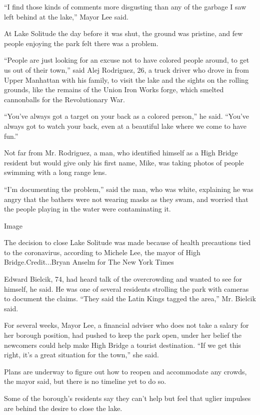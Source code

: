 ``I find those kinds of comments more disgusting than any of the garbage
I saw left behind at the lake,'' Mayor Lee said.

At Lake Solitude the day before it was shut, the ground was pristine,
and few people enjoying the park felt there was a problem.

``People are just looking for an excuse not to have colored people
around, to get us out of their town,'' said Alej Rodriguez, 26, a truck
driver who drove in from Upper Manhattan with his family, to visit the
lake and the sights on the rolling grounds, like the remains of the
Union Iron Works forge, which smelted cannonballs for the Revolutionary
War.

``You've always got a target on your back as a colored person,'' he
said. ``You've always got to watch your back, even at a beautiful lake
where we come to have fun.''

Not far from Mr. Rodriguez, a man, who identified himself as a High
Bridge resident but would give only his first name, Mike, was taking
photos of people swimming with a long range lens.

``I'm documenting the problem,'' said the man, who was white, explaining
he was angry that the bathers were not wearing masks as they swam, and
worried that the people playing in the water were contaminating it.

Image

The decision to close Lake Solitude was made because of health
precautions tied to the coronavirus, according to Michele Lee, the mayor
of High Bridge.Credit...Bryan Anselm for The New York Times

Edward Bielcik, 74, had heard talk of the overcrowding and wanted to see
for himself, he said. He was one of several residents strolling the park
with cameras to document the claims. ``They said the Latin Kings tagged
the area,'' Mr. Bielcik said.

For several weeks, Mayor Lee, a financial adviser who does not take a
salary for her borough position, had pushed to keep the park open, under
her belief the newcomers could help make High Bridge a tourist
destination. ``If we get this right, it's a great situation for the
town,'' she said.

Plans are underway to figure out how to reopen and accommodate any
crowds, the mayor said, but there is no timeline yet to do so.

Some of the borough's residents say they can't help but feel that uglier
impulses are behind the desire to close the lake.

